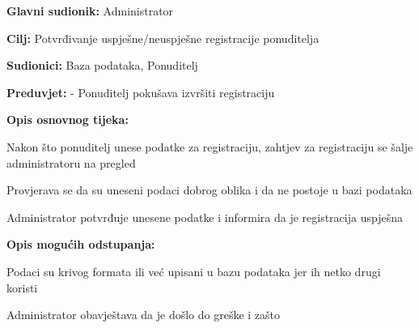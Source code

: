                     \noindent {}
					\begin{packed_item}
	
						\item \textbf{Glavni sudionik: } Administrator
						\item  \textbf{Cilj:} Potvrđivanje uspješne/neuspješne registracije ponuditelja
						\item  \textbf{Sudionici:} Baza podataka, Ponuditelj
						\item  \textbf{Preduvjet:} - Ponuditelj pokušava izvršiti registraciju
						\item  \textbf{Opis osnovnog tijeka:}
						
						\item[] \begin{packed_enum}
	
							\item Nakon što ponuditelj unese podatke za registraciju, zahtjev za registraciju se šalje administratoru na pregled
							\item Provjerava se da su uneseni podaci dobrog oblika i da ne postoje u bazi podataka
                            \item Administrator potvrđuje unesene podatke i informira da je registracija uspješna
						\end{packed_enum}
						
						\item  \textbf{Opis mogućih odstupanja:}
						
						\item[] \begin{packed_item}
	
							\item[2.a] Podaci su krivog formata ili već upisani u bazu podataka jer ih netko drugi koristi
							\item[] \begin{packed_enum}			
								\item Administrator obavještava da je došlo do greške i zašto
							\end{packed_enum}
						\end{packed_item}
					\end{packed_item}


